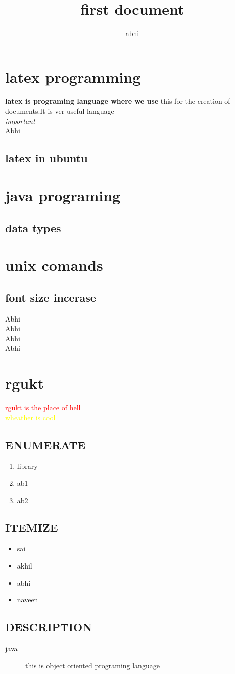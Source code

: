 \documentclass{article}
\title{first document}
\author{abhi}
\begin{document}
 	\maketitle
 	
 \tableofcontents
 \newpage
 \section{latex programming}\label{sec:intro}
 	\textbf{latex is programing language where we use }   this for the creation of documents.It is ver useful language\\ \textit{important}\\
 	\underline{Abhi}
 \subsection{latex in ubuntu}
 
 \section{java programing}\label{sec:intro}
 \subsection{data types}
 
 \section{unix comands}
 \subsection{font size incerase}
 \large Abhi\\
 \LARGE Abhi\\
 \huge Abhi\\
 \Huge Abhi
 
 
 \section{rgukt}
 \textcolor{red}{rgukt is the place of hell}\\
 \textcolor{yellow}{wheather is cool }
 
 

 \subsection{ENUMERATE}
 \begin{enumerate}
 	\item library
 	\item ab1
 	\item ab2
 \end{enumerate}
\subsection{ITEMIZE}
\begin{itemize}
	\item sai
	\item akhil
	\item abhi
	\item naveen
\end{itemize}
\subsection{DESCRIPTION}
\begin{description}
	\item[java] this is object oriented programing language
\end{description}
 
\end{document}
